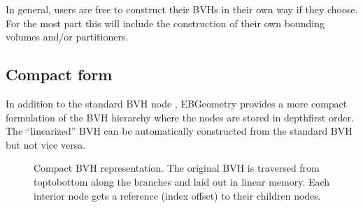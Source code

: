 \documentclass[letterpaper,10pt,english]{sphinxmanual}
\let\sphinxpxdimen\pdfpxdimen\else\newdimen\sphinxpxdimen
\begin{document}
\sphinxAtStartPar
In general, users are free to construct their BVHs in their own way if they choose.
For the most part this will include the construction of their own bounding volumes and/or partitioners.


\subsection{Compact form}
\label{\detokenize{ImplemBVH:compact-form}}\label{\detokenize{ImplemBVH:chap-linearbvh}}
\sphinxAtStartPar
In addition to the standard BVH node , EBGeometry provides a more compact formulation of the BVH hierarchy where the nodes are stored in depth\sphinxhyphen{}first order.
The “linearized” BVH can be automatically constructed from the standard BVH but not vice versa.

\begin{figure}[htbp]
\centering
\capstart

\noindent\sphinxincludegraphics[width=240\sphinxpxdimen]{{CompactBVH}.png}
\caption{Compact BVH representation.
The original BVH is traversed from top\sphinxhyphen{}to\sphinxhyphen{}bottom along the branches and laid out in linear memory.
Each interior node gets a reference (index offset) to their children nodes.}\label{\detokenize{ImplemBVH:id1}}\end{figure}
\end{document}
